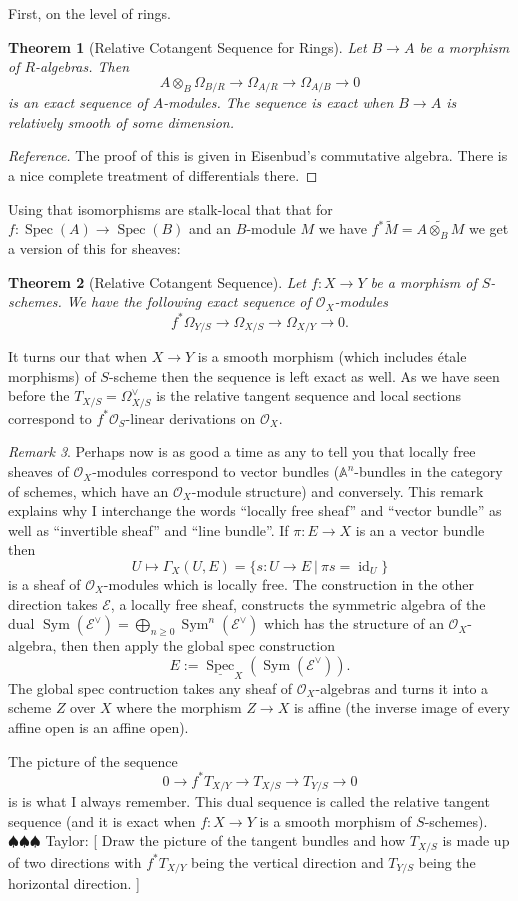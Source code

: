 \documentclass[12pt]{article}
\numberwithin{equation}{section}
\newtheorem{theorem}{Theorem}[subsection]
\theoremstyle{definition}
\theoremstyle{remark}
\newtheorem{remark}[theorem]{Remark}
\newcommand{\id}{\operatorname{id}}
\newcommand{\Ocal}{\mathcal{O}}
\renewcommand{\AA}{\mathbb{A}}
\newcommand{\Spec}{\operatorname{Spec}}
\newcommand{\Sym}{\operatorname{Sym}}
\newcommand{\taylor}[1]{{\color{blue} \sf $\spadesuit\spadesuit\spadesuit$ Taylor: [#1]}}
\begin{document}
First, on the level of rings.
\begin{theorem}[Relative Cotangent Sequence for Rings]
	Let $B \to A$ be a morphism of $R$-algebras. 
	Then 
	 $$ A \otimes_B \Omega_{B/R} \to \Omega_{A/R} \to \Omega_{A/B} \to 0$$
	is an exact sequence of $A$-modules.
	The sequence is exact when $B\to A$ is relatively smooth of some dimension.
\end{theorem}
\begin{proof}[Reference]
	The proof of this is given in Eisenbud's commutative algebra. 
	There is a nice complete treatment of differentials there. 
\end{proof}

Using that isomorphisms are stalk-local that that for $f: \Spec(A)\to \Spec(B)$ and an $B$-module $M$ we have $f^* \widetilde{M} =\widetilde{A \otimes_B M}$ we get a version of this for sheaves:
\begin{theorem}[Relative Cotangent Sequence]
	Let $f:X\to Y$ be a morphism of $S$-schemes. 
	We have the following exact sequence of $\Ocal_X$-modules 
	 $$ f^*\Omega_{Y/S} \to \Omega_{X/S} \to \Omega_{X/Y} \to 0. $$
\end{theorem}
It turns our that when $X\to Y$ is a smooth morphism (which includes \'etale morphisms) of $S$-scheme then the sequence is left exact as well. 
As we have seen before the $T_{X/S} = \Omega_{X/S}^{\vee}$ is the relative tangent sequence and local sections correspond to $f^*\Ocal_S$-linear derivations on $\Ocal_X$.
\begin{remark}
Perhaps now is as good a time as any to tell you that locally free sheaves of $\Ocal_X$-modules correspond to vector bundles ($\AA^n$-bundles in the category of schemes, which have an $\Ocal_X$-module structure) and conversely. 
This remark explains why I interchange the words ``locally free sheaf'' and ``vector bundle'' as well as ``invertible sheaf'' and ``line bundle''.
If $\pi: E\to X$ is an a vector bundle then 
 $$ U \mapsto \Gamma_X(U,E) = \lbrace s: U \to E \ \vert \ \pi s = \id_U \rbrace $$
is a sheaf of $\Ocal_X$-modules which is locally free.
The construction in the other direction takes $\mathcal{E}$, a locally free sheaf, constructs the symmetric algebra of the dual $\Sym(\mathcal{E}^{\vee}) = \bigoplus_{n \geq 0} \Sym^n(\mathcal{E}^{\vee})$ which has the structure of an $\Ocal_X$-algebra, then then apply the global spec construction 
 $$ E := \underline{\Spec}_X( \Sym(\mathcal{E}^{\vee})).$$
The global spec contruction takes any sheaf of $\Ocal_X$-algebras and turns it into a scheme $Z$ over $X$ where the morphism $Z\to X$ is affine (the inverse image of every affine open is an affine open). 
\end{remark} 
The picture of the sequence 
 $$ 0 \to f^*T_{X/Y} \to T_{X/S} \to T_{Y/S} \to 0 $$
is is what I always remember. 
This dual sequence is called the relative tangent sequence (and it is exact when $f:X\to Y$ is a smooth morphism of $S$-schemes).
\taylor{
Draw the picture of the tangent bundles and how $T_{X/S}$ is made up of two directions with $f^*T_{X/Y}$ being the vertical direction and $T_{Y/S}$ being the horizontal direction.
}
\end{document}
